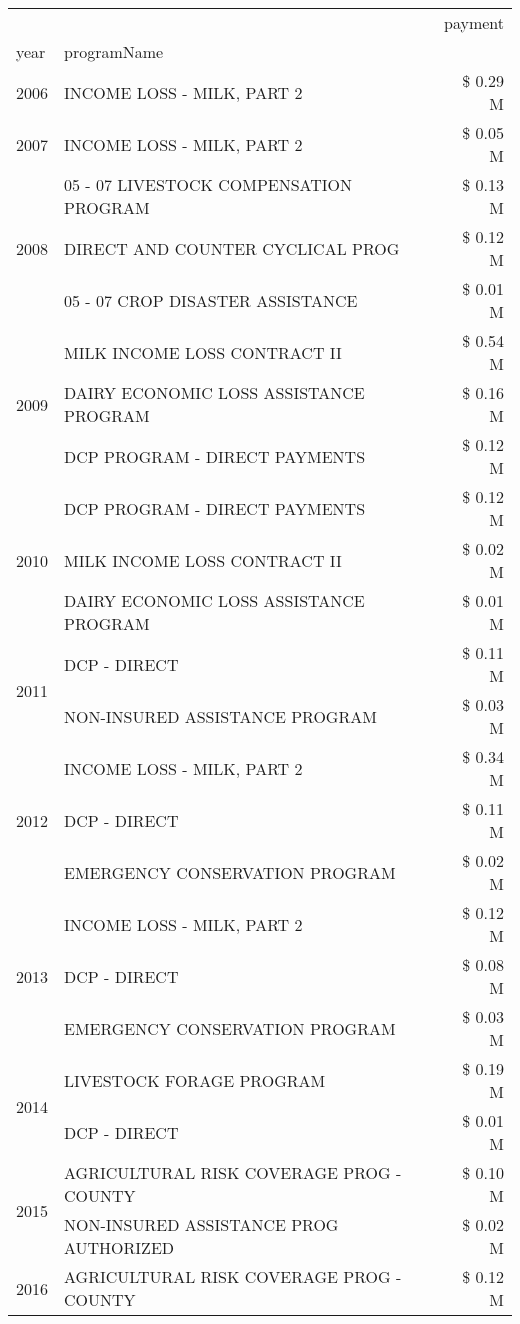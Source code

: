 \begin{tabular}{llr}
\toprule
 &  & payment \\
year & programName &  \\
\midrule
2006 & INCOME LOSS - MILK, PART 2 & \$ 0.29 M \\
\cline{1-3}
2007 & INCOME LOSS - MILK, PART 2 & \$ 0.05 M \\
\cline{1-3}
\multirow[t]{3}{*}{2008} & 05 - 07 LIVESTOCK COMPENSATION PROGRAM & \$ 0.13 M \\
 & DIRECT AND COUNTER CYCLICAL PROG & \$ 0.12 M \\
 & 05 - 07 CROP DISASTER ASSISTANCE & \$ 0.01 M \\
\cline{1-3}
\multirow[t]{3}{*}{2009} & MILK INCOME LOSS CONTRACT II & \$ 0.54 M \\
 & DAIRY ECONOMIC LOSS ASSISTANCE PROGRAM & \$ 0.16 M \\
 & DCP PROGRAM - DIRECT PAYMENTS & \$ 0.12 M \\
\cline{1-3}
\multirow[t]{3}{*}{2010} & DCP PROGRAM - DIRECT PAYMENTS & \$ 0.12 M \\
 & MILK INCOME LOSS CONTRACT II & \$ 0.02 M \\
 & DAIRY ECONOMIC LOSS ASSISTANCE PROGRAM & \$ 0.01 M \\
\cline{1-3}
\multirow[t]{2}{*}{2011} & DCP - DIRECT & \$ 0.11 M \\
 & NON-INSURED ASSISTANCE PROGRAM & \$ 0.03 M \\
\cline{1-3}
\multirow[t]{3}{*}{2012} & INCOME LOSS - MILK, PART 2 & \$ 0.34 M \\
 & DCP - DIRECT & \$ 0.11 M \\
 & EMERGENCY CONSERVATION PROGRAM & \$ 0.02 M \\
\cline{1-3}
\multirow[t]{3}{*}{2013} & INCOME LOSS - MILK, PART 2 & \$ 0.12 M \\
 & DCP - DIRECT & \$ 0.08 M \\
 & EMERGENCY CONSERVATION PROGRAM & \$ 0.03 M \\
\cline{1-3}
\multirow[t]{2}{*}{2014} & LIVESTOCK FORAGE PROGRAM & \$ 0.19 M \\
 & DCP - DIRECT & \$ 0.01 M \\
\cline{1-3}
\multirow[t]{2}{*}{2015} & AGRICULTURAL RISK COVERAGE PROG - COUNTY & \$ 0.10 M \\
 & NON-INSURED ASSISTANCE PROG AUTHORIZED & \$ 0.02 M \\
\cline{1-3}
\multirow[t]{3}{*}{2016} & AGRICULTURAL RISK COVERAGE PROG - COUNTY & \$ 0.12 M \\

\end{tabular}
